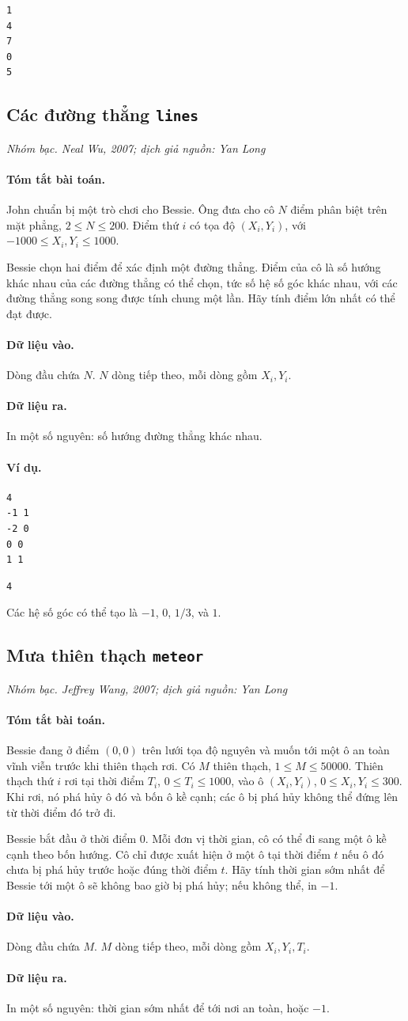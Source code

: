 \documentclass[11pt]{article}
\newcommand{\problem}[4]{%
  \subsection[#1 (#2)]{#1 \hfill {\normalsize\texttt{#2}}}%
  \noindent\textit{#3. #4}\par\smallskip
}
\newcommand{\iosec}[1]{\paragraph{#1}}
\begin{document}
\begin{verbatim}
1
4
7
0
5
\end{verbatim}

\problem{Các đường thẳng}{lines}{Nhóm bạc}{Neal Wu, 2007; dịch giả nguồn: Yan Long}

\iosec{Tóm tắt bài toán.}
John chuẩn bị một trò chơi cho Bessie. Ông đưa cho cô \(N\) điểm phân biệt
trên mặt phẳng, \(2\le N\le 200\). Điểm thứ \(i\) có tọa độ
\((X_i,Y_i)\), với \(-1000\le X_i,Y_i\le 1000\).

Bessie chọn hai điểm để xác định một đường thẳng. Điểm của cô là số hướng
khác nhau của các đường thẳng có thể chọn, tức số hệ số góc khác nhau, với
các đường thẳng song song được tính chung một lần. Hãy tính điểm lớn nhất có
thể đạt được.

\iosec{Dữ liệu vào.}
Dòng đầu chứa \(N\). \(N\) dòng tiếp theo, mỗi dòng gồm \(X_i,Y_i\).

\iosec{Dữ liệu ra.}
In một số nguyên: số hướng đường thẳng khác nhau.

\iosec{Ví dụ.}
\begin{verbatim}
4
-1 1
-2 0
0 0
1 1
\end{verbatim}

\begin{verbatim}
4
\end{verbatim}

Các hệ số góc có thể tạo là \(-1\), \(0\), \(1/3\), và \(1\).

\problem{Mưa thiên thạch}{meteor}{Nhóm bạc}{Jeffrey Wang, 2007; dịch giả nguồn: Yan Long}

\iosec{Tóm tắt bài toán.}
Bessie đang ở điểm \((0,0)\) trên lưới tọa độ nguyên và muốn tới một ô an
toàn vĩnh viễn trước khi thiên thạch rơi. Có \(M\) thiên thạch,
\(1\le M\le 50000\). Thiên thạch thứ \(i\) rơi tại thời điểm \(T_i\),
\(0\le T_i\le 1000\), vào ô \((X_i,Y_i)\), \(0\le X_i,Y_i\le 300\). Khi rơi,
nó phá hủy ô đó và bốn ô kề cạnh; các ô bị phá hủy không thể đứng lên từ thời
điểm đó trở đi.

Bessie bắt đầu ở thời điểm \(0\). Mỗi đơn vị thời gian, cô có thể đi sang một
ô kề cạnh theo bốn hướng. Cô chỉ được xuất hiện ở một ô tại thời điểm \(t\)
nếu ô đó chưa bị phá hủy trước hoặc đúng thời điểm \(t\). Hãy tính thời gian
sớm nhất để Bessie tới một ô sẽ không bao giờ bị phá hủy; nếu không thể, in
\(-1\).

\iosec{Dữ liệu vào.}
Dòng đầu chứa \(M\). \(M\) dòng tiếp theo, mỗi dòng gồm \(X_i,Y_i,T_i\).

\iosec{Dữ liệu ra.}
In một số nguyên: thời gian sớm nhất để tới nơi an toàn, hoặc \(-1\).
\end{document}
